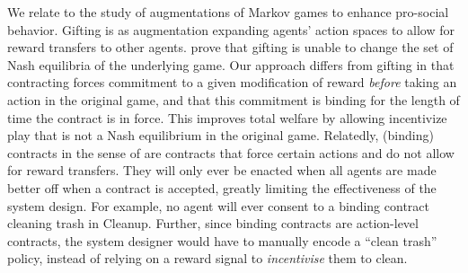 \documentclass[referee,sn-basic]{sn-jnl}
\theoremstyle{thmstyleone}%
\theoremstyle{thmstyletwo}%
\theoremstyle{thmstylethree}%
\begin{document}
We relate to the study of augmentations of Markov games to enhance pro-social behavior. Gifting \cite{lupu2020gifting,wang2021emergent} is as augmentation expanding agents' action spaces to allow for reward transfers to other agents. \cite{wang2021emergent} prove that gifting is unable to change the set of Nash equilibria of the underlying game. Our approach differs from gifting in that contracting forces commitment to a given modification of reward \emph{before} taking an action in the original game, and that this commitment is binding for the length of time the contract is in force. This improves total welfare by allowing incentivize play that is not a Nash equilibrium in the original game. Relatedly, (binding) contracts in the sense of \citet{hughes2020learning} are contracts that force certain actions and do not allow for reward transfers. They will only ever be enacted when all agents are made better off when a contract is accepted, greatly limiting the effectiveness of the system design. For example, no agent will ever consent to a binding contract cleaning trash in Cleanup. Further, since binding contracts are action-level contracts, the system designer would have to manually encode a \enquote{clean trash} policy, instead of relying on a reward signal to \emph{incentivise} them to clean.
\end{document}
